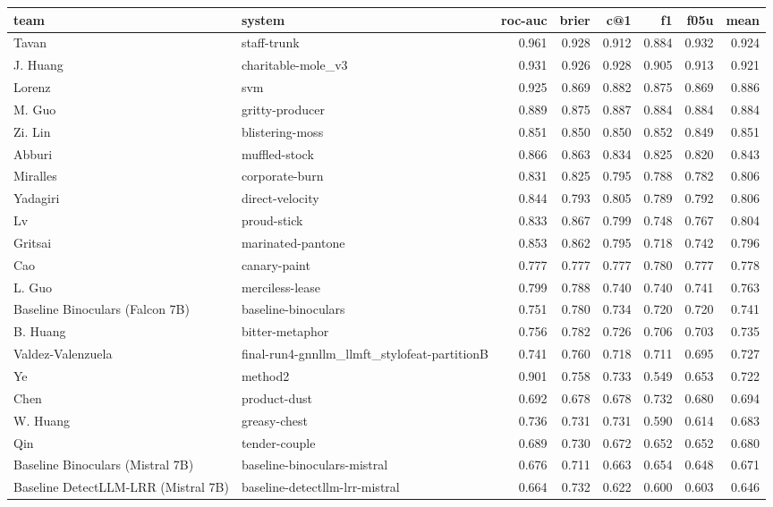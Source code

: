 \begin{tabular}{llrrrrrr}
\toprule
team & system & roc-auc & brier & c@1 & f1 & f05u & mean \\
\midrule
Tavan & staff-trunk & 0.961 & 0.928 & 0.912 & 0.884 & 0.932 & 0.924 \\
J. Huang & charitable-mole_v3 & 0.931 & 0.926 & 0.928 & 0.905 & 0.913 & 0.921 \\
Lorenz & svm & 0.925 & 0.869 & 0.882 & 0.875 & 0.869 & 0.886 \\
M. Guo & gritty-producer & 0.889 & 0.875 & 0.887 & 0.884 & 0.884 & 0.884 \\
Zi. Lin & blistering-moss & 0.851 & 0.850 & 0.850 & 0.852 & 0.849 & 0.851 \\
Abburi & muffled-stock & 0.866 & 0.863 & 0.834 & 0.825 & 0.820 & 0.843 \\
Miralles & corporate-burn & 0.831 & 0.825 & 0.795 & 0.788 & 0.782 & 0.806 \\
Yadagiri & direct-velocity & 0.844 & 0.793 & 0.805 & 0.789 & 0.792 & 0.806 \\
Lv & proud-stick & 0.833 & 0.867 & 0.799 & 0.748 & 0.767 & 0.804 \\
Gritsai & marinated-pantone & 0.853 & 0.862 & 0.795 & 0.718 & 0.742 & 0.796 \\
Cao & canary-paint & 0.777 & 0.777 & 0.777 & 0.780 & 0.777 & 0.778 \\
L. Guo & merciless-lease & 0.799 & 0.788 & 0.740 & 0.740 & 0.741 & 0.763 \\
Baseline Binoculars (Falcon 7B) & baseline-binoculars & 0.751 & 0.780 & 0.734 & 0.720 & 0.720 & 0.741 \\
B. Huang & bitter-metaphor & 0.756 & 0.782 & 0.726 & 0.706 & 0.703 & 0.735 \\
Valdez-Valenzuela & final-run4-gnnllm_llmft_stylofeat-partitionB & 0.741 & 0.760 & 0.718 & 0.711 & 0.695 & 0.727 \\
Ye & method2 & 0.901 & 0.758 & 0.733 & 0.549 & 0.653 & 0.722 \\
Chen & product-dust & 0.692 & 0.678 & 0.678 & 0.732 & 0.680 & 0.694 \\
W. Huang & greasy-chest & 0.736 & 0.731 & 0.731 & 0.590 & 0.614 & 0.683 \\
Qin & tender-couple & 0.689 & 0.730 & 0.672 & 0.652 & 0.652 & 0.680 \\
Baseline Binoculars (Mistral 7B) & baseline-binoculars-mistral & 0.676 & 0.711 & 0.663 & 0.654 & 0.648 & 0.671 \\
Baseline DetectLLM-LRR (Mistral 7B) & baseline-detectllm-lrr-mistral & 0.664 & 0.732 & 0.622 & 0.600 & 0.603 & 0.646 \\

\end{tabular}
